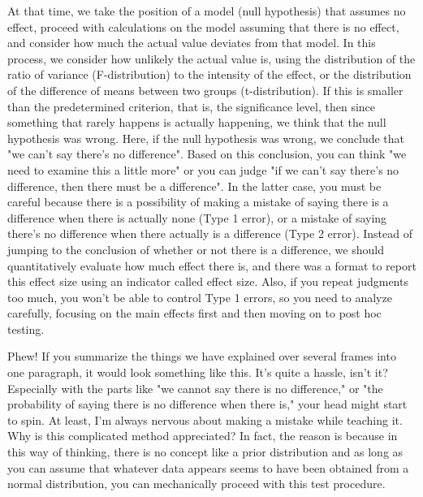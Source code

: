 \documentclass{ltjbook}
\begin{document}
At that time, we take the position of a model (null hypothesis) that assumes no effect, proceed with calculations on the model assuming that there is no effect, and consider how much the actual value deviates from that model. In this process, we consider how unlikely the actual value is, using the distribution of the ratio of variance (F-distribution) to the intensity of the effect, or the distribution of the difference of means between two groups (t-distribution). If this is smaller than the predetermined criterion, that is, the significance level, then since something that rarely happens is actually happening, we think that the null hypothesis was wrong. Here, if the null hypothesis was wrong, we conclude that "we can't say there's no difference". Based on this conclusion, you can think "we need to examine this a little more" or you can judge "if we can't say there's no difference, then there must be a difference". In the latter case, you must be careful because there is a possibility of making a mistake of saying there is a difference when there is actually none (Type 1 error), or a mistake of saying there's no difference when there actually is a difference (Type 2 error). Instead of jumping to the conclusion of whether or not there is a difference, we should quantitatively evaluate how much effect there is, and there was a format to report this effect size using an indicator called effect size. Also, if you repeat judgments too much, you won't be able to control Type 1 errors, so you need to analyze carefully, focusing on the main effects first and then moving on to post hoc testing.

Phew! If you summarize the things we have explained over several frames into one paragraph, it would look something like this. It's quite a hassle, isn't it? Especially with the parts like "we cannot say there is no difference," or "the probability of saying there is no difference when there is," your head might start to spin. At least, I'm always nervous about making a mistake while teaching it. Why is this complicated method appreciated? In fact, the reason is because in this way of thinking, there is no concept like a prior distribution and as long as you can assume that whatever data appears seems to have been obtained from a normal distribution, you can mechanically proceed with this test procedure.
\end{document}
